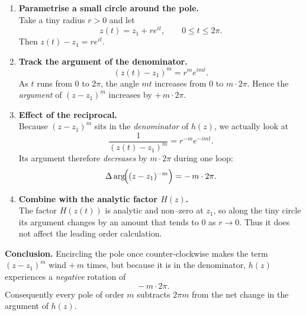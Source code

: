 \documentclass[12pt]{article}
\theoremstyle{definition} %
\theoremstyle{plain} %
\begin{document}
\begin{enumerate}
    \item\textbf{Parametrise a small circle around the pole.}\\
          Take a tiny radius \(r>0\) and let
          \[
              z(t)=z_{1}+re^{it},\qquad 0\le t\le 2\pi .
          \]
          Then \(z(t)-z_{1}=re^{it}\).

    \item\textbf{Track the argument of the denominator.}\\
          \[
              (z(t)-z_{1})^{m}=r^{m}e^{imt}.
          \]
          As \(t\) runs from \(0\) to \(2\pi\), the angle \(mt\) increases from \(0\) to \(m\cdot2\pi\).
          Hence the \emph{argument} of \((z-z_{1})^{m}\) increases by \(+\,m\cdot2\pi\).

    \item\textbf{Effect of the reciprocal.}\\
          Because \((z-z_{1})^{m}\) sits in the \emph{denominator} of \(h(z)\), we actually look at
          \[
              \frac{1}{(z(t)-z_{1})^{m}}=r^{-m}e^{-imt}.
          \]
          Its argument therefore \emph{decreases} by \(m\cdot2\pi\) during one loop:
          \[
              \Delta\arg\!\Bigl((z-z_{1})^{-m}\Bigr)= -\,m\cdot2\pi .
          \]

    \item\textbf{Combine with the analytic factor \(H(z)\).}\\
          The factor \(H(z(t))\) is analytic and non–zero at \(z_{1}\), so along the tiny circle its argument changes by an amount that tends to \(0\) as \(r\to0\).  Thus it does not affect the leading order calculation.

\end{enumerate}

\noindent
\textbf{Conclusion.}  
Encircling the pole once counter‑clockwise makes the term \((z-z_{1})^{m}\) wind \(+\,m\) times, but because it is in the denominator, \(h(z)\) experiences a \emph{negative} rotation of
\[
   -\,m\cdot2\pi.
\]
Consequently every pole of order \(m\) subtracts \(2\pi m\) from the net change in the argument of \(h(z)\).
\end{document}
